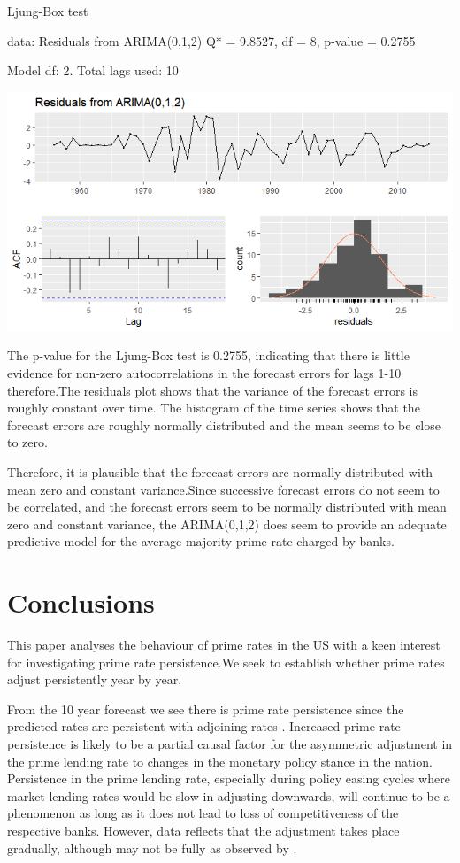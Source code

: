 \documentclass[12pt, a4paper]{report}\usepackage[]{graphicx}\usepackage[]{color}
\begin{document}
	Ljung-Box test

data:  Residuals from ARIMA(0,1,2)
Q* = 9.8527, df = 8, p-value = 0.2755

Model df: 2.   Total lags used: 10

\begin{center}
\includegraphics{rplot08}
\end{center}
The p-value for the Ljung-Box test is 0.2755, indicating that there is little evidence for non-zero autocorrelations in the forecast errors for lags 1-10 therefore.The residuals plot shows that the variance of the forecast errors is roughly constant over time. The histogram of the time series shows that the forecast errors are roughly normally distributed and the mean seems to be close to zero.

Therefore, it is plausible that the forecast errors are normally distributed with mean zero and constant variance.Since successive forecast errors do not seem to be correlated, and the forecast errors seem to be normally distributed with mean zero and constant variance, the ARIMA(0,1,2) does seem to provide an adequate predictive model for the average majority prime rate charged by banks.
\section{Conclusions}
This paper analyses the behaviour of prime rates in the US with a keen interest for investigating prime rate persistence.We seek to establish whether prime rates adjust persistently year by year.


From the 10 year forecast  we see there is prime rate persistence since the predicted rates are persistent with adjoining rates .
Increased prime rate persistence is likely to be a partial causal factor for the asymmetric adjustment in the prime lending rate to changes in the monetary policy stance in the nation.
Persistence in the prime lending rate, especially during policy easing cycles where market lending rates would be slow in adjusting downwards, will continue to be a phenomenon as long as it does not lead to loss of competitiveness of the respective banks. However, data reflects that the adjustment takes place gradually, although may not be fully as observed by \citet{perera2018analysis}.
\end{document}
